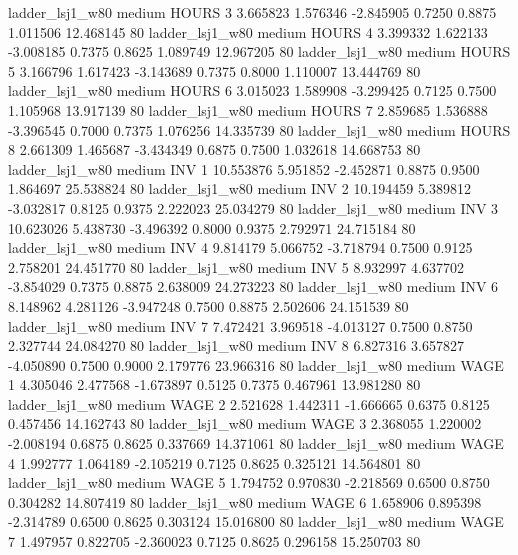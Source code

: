        ladder_lsj1_w80     medium    HOURS                 3  3.665823 1.576346 -2.845905 0.7250 0.8875  1.011506   12.468145 80
       ladder_lsj1_w80     medium    HOURS                 4  3.399332 1.622133 -3.008185 0.7375 0.8625  1.089749   12.967205 80
       ladder_lsj1_w80     medium    HOURS                 5  3.166796 1.617423 -3.143689 0.7375 0.8000  1.110007   13.444769 80
       ladder_lsj1_w80     medium    HOURS                 6  3.015023 1.589908 -3.299425 0.7125 0.7500  1.105968   13.917139 80
       ladder_lsj1_w80     medium    HOURS                 7  2.859685 1.536888 -3.396545 0.7000 0.7375  1.076256   14.335739 80
       ladder_lsj1_w80     medium    HOURS                 8  2.661309 1.465687 -3.434349 0.6875 0.7500  1.032618   14.668753 80
       ladder_lsj1_w80     medium      INV                 1 10.553876 5.951852 -2.452871 0.8875 0.9500  1.864697   25.538824 80
       ladder_lsj1_w80     medium      INV                 2 10.194459 5.389812 -3.032817 0.8125 0.9375  2.222023   25.034279 80
       ladder_lsj1_w80     medium      INV                 3 10.623026 5.438730 -3.496392 0.8000 0.9375  2.792971   24.715184 80
       ladder_lsj1_w80     medium      INV                 4  9.814179 5.066752 -3.718794 0.7500 0.9125  2.758201   24.451770 80
       ladder_lsj1_w80     medium      INV                 5  8.932997 4.637702 -3.854029 0.7375 0.8875  2.638009   24.273223 80
       ladder_lsj1_w80     medium      INV                 6  8.148962 4.281126 -3.947248 0.7500 0.8875  2.502606   24.151539 80
       ladder_lsj1_w80     medium      INV                 7  7.472421 3.969518 -4.013127 0.7500 0.8750  2.327744   24.084270 80
       ladder_lsj1_w80     medium      INV                 8  6.827316 3.657827 -4.050890 0.7500 0.9000  2.179776   23.966316 80
       ladder_lsj1_w80     medium     WAGE                 1  4.305046 2.477568 -1.673897 0.5125 0.7375  0.467961   13.981280 80
       ladder_lsj1_w80     medium     WAGE                 2  2.521628 1.442311 -1.666665 0.6375 0.8125  0.457456   14.162743 80
       ladder_lsj1_w80     medium     WAGE                 3  2.368055 1.220002 -2.008194 0.6875 0.8625  0.337669   14.371061 80
       ladder_lsj1_w80     medium     WAGE                 4  1.992777 1.064189 -2.105219 0.7125 0.8625  0.325121   14.564801 80
       ladder_lsj1_w80     medium     WAGE                 5  1.794752 0.970830 -2.218569 0.6500 0.8750  0.304282   14.807419 80
       ladder_lsj1_w80     medium     WAGE                 6  1.658906 0.895398 -2.314789 0.6500 0.8625  0.303124   15.016800 80
       ladder_lsj1_w80     medium     WAGE                 7  1.497957 0.822705 -2.360023 0.7125 0.8625  0.296158   15.250703 80
